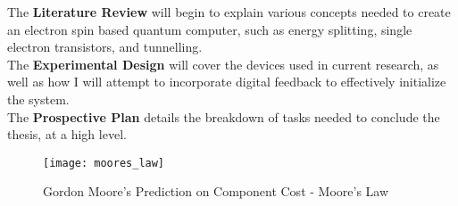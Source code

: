 The \textbf{Literature Review} will begin to explain various concepts needed to create an electron spin based quantum computer, such as energy splitting, single electron transistors, and tunnelling. \\
The \textbf{Experimental Design} will cover the devices used in current research, as well as how I will attempt to incorporate digital feedback to effectively initialize the system. \\
The \textbf{Prospective Plan} details the breakdown of tasks needed to conclude the thesis, at a high level. \\

\begin{figure}[htbp!]
	\centering
	\texttt{[image: moores\_law]}
	\caption{Gordon Moore's Prediction on Component Cost - Moore's Law}
	\label{fig::moores_law}
\end{figure}
